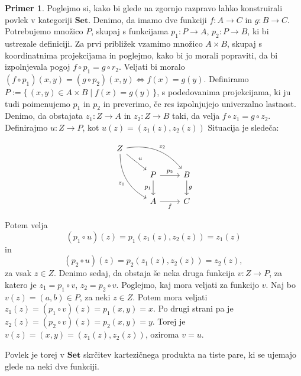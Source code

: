 \documentclass[12pt,a4paper]{book}
\theoremstyle{definition}
\theoremstyle{plain}
\theoremstyle{definition}
\newtheorem{primer}{Primer}[section]
\theoremstyle{remark}
\newcommand{\cat}[1]{\textbf{#1}}
\renewcommand{\set}[1]{\{\,#1\,\}}
\begin{document}
\begin{primer}
Poglejmo si, kako bi glede na zgornjo razpravo lahko konstruirali povlek v kategoriji $\cat{Set}$. Denimo, da imamo dve funkciji $f : A \to C$ in $g : B \to C$. Potrebujemo množico $P$, skupaj s funkcijama $p_1 : P \to A$, $p_2 : P \to B$, ki bi ustrezale definiciji. Za prvi približek vzamimo množico $A \times B$, skupaj s koordinatnima projekcijama in poglejmo, kako bi jo morali popraviti, da bi izpolnjevala pogoj $f \circ p_1 = g \circ r_2$. Veljati bi moralo $(f \circ p_1)(x,y) = (g \circ p_2)(x,y) \Leftrightarrow f(x) = g(y)$. Definiramo $P := \set{(x,y) \in A \times B \mid f(x) = g(y)}$, s podedovanima projekcijama, ki ju tudi poimenujemo $p_1$ in $p_2$ in preverimo, če res izpolnjujejo univerzalno lastnost. Denimo, da obstajata $z_1 : Z \to A$ in $z_2 : Z \to B$ taki, da velja $f \circ z_1 = g \circ z_2$. Definirajmo $u : Z \to P$, kot $u(z) = (z_1(z), z_2(z))$
Situacija je sledeča:

$$\begin{tikzcd}
Z
\arrow[drr, bend left, "z_2"]
\ar[dr, "u"]
\arrow[ddr, bend right, "z_1"'] & & \\
& P \arrow[r, "p_2"] \arrow[d, "p_1"']
& B \arrow[d, "g"] \\
& A \arrow[r, "f"']
& C
\end{tikzcd}$$

Potem velja 
$$(p_1 \circ u)(z) = p_1(z_1(z),z_2(z)) = z_1(z)$$ 
in 
$$(p_2 \circ u)(z) = p_2(z_1(z),z_2(z)) = z_2(z),$$ 
za vsak $z \in Z$. Denimo sedaj, da obstaja še neka druga funkcija $v : Z \to P$, za katero je $z_1 = p_1 \circ v$, $z_2 = p_2 \circ v$. Poglejmo, kaj mora veljati za funkcijo $v$. Naj bo $v(z) = (a,b) \in P$, za neki $z \in Z$. Potem mora veljati $z_1(z) = (p_1 \circ v)(z) = p_1(x,y) = x$. Po drugi strani pa je $z_2(z) = (p_2 \circ v)(z) = p_2(x,y) = y$. Torej je $v(z) = (x,y) = (z_1(z),z_2(z))$, oziroma $v = u$.
\end{primer}

Povlek je torej v $\cat{Set}$ skrčitev kartezičnega produkta na tiste pare, ki se ujemajo glede na neki dve funkciji.
\end{document}
